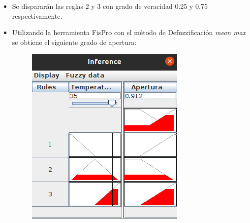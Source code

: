 \documentclass[11pt]{article}
\begin{document}
\begin{itemize}
    \item Se dispararán las reglas 2 y 3 con grado de veracidad 0.25 y 0.75 respectivamente.
    \item Utilizando la herramienta FisPro con el método de Defuzzificación \emph{mean max}
          se obtiene el siguiente grado de apertura:

          \begin{figure}[h!]
            \begin{center}
              \includegraphics[width=0.4\linewidth]{t35.jpeg}
            \end{center}
          \end{figure}
\end{itemize}
\end{document}
